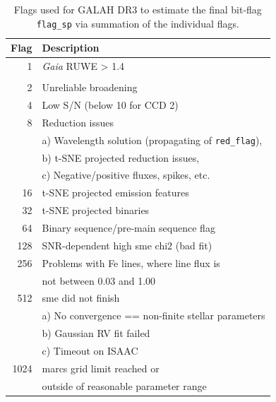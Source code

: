 \documentclass[fleqn,usenatbib,useAMS]{mnras}
\newcommand{\Gaia}{\textit{Gaia}\xspace}
\begin{document}
\begin{table}
\centering
 \caption{Flags used for GALAH DR3 to estimate the final bit-flag \texttt{flag\_sp} via summation of the individual flags.}
 \label{tab:flag_sp_galah_dr3}
 \begin{tabular}{rl}
  \hline \hline
Flag		&	Description	\\
\hline
   1	&	\Gaia RUWE > 1.4 \\
   	&	\citep[unreliable astrometric solution, see][]{Lindegren2018b} \\
   2	&	Unreliable broadening \\
   4	&	Low S/N (below 10 for CCD 2) \\
   8	&	Reduction issues \\
	&	a) Wavelength solution (propagating of \texttt{red\_flag}), \\
	&	b) t-SNE projected reduction issues, \\
	&	c) Negative/positive fluxes, spikes, etc. \\
  16	&	t-SNE projected emission features \\
  32	&	t-SNE projected binaries \\
  64	&	Binary sequence/pre-main sequence flag \\
 128	&	SNR-dependent high {\sc sme} chi2 (bad fit) \\
 256	&	Problems with Fe lines, where line flux is \\
 	&	not between 0.03 and 1.00 \\
 512	&	{\sc sme} did not finish \\
     	&	a) No convergence == non-finite stellar parameters \\
   	&	b) Gaussian RV fit failed \\
     	&	c) Timeout on ISAAC \\
1024	&	{\sc marcs} grid limit reached or \\
	&	outside of reasonable parameter range \\
  \hline
 \end{tabular}
\end{table}
\end{document}
